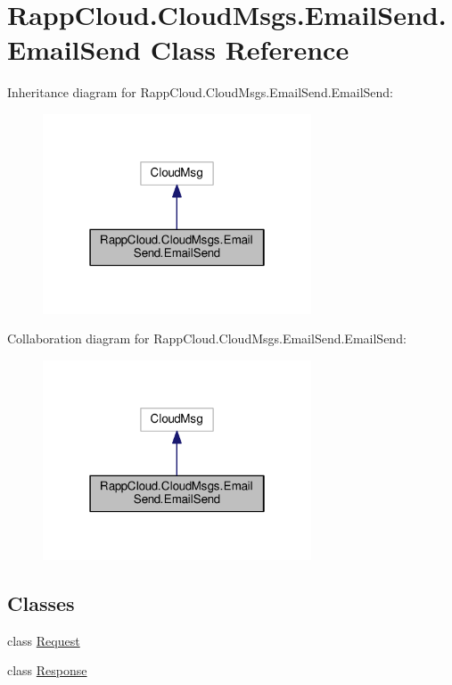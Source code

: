 \hypertarget{classRappCloud_1_1CloudMsgs_1_1EmailSend_1_1EmailSend}{\section{Rapp\-Cloud.\-Cloud\-Msgs.\-Email\-Send.\-Email\-Send Class Reference}
\label{classRappCloud_1_1CloudMsgs_1_1EmailSend_1_1EmailSend}
}


Inheritance diagram for Rapp\-Cloud.\-Cloud\-Msgs.\-Email\-Send.\-Email\-Send\-:
\nopagebreak
\begin{figure}[H]
\begin{center}
\leavevmode
\includegraphics[width=226pt]{classRappCloud_1_1CloudMsgs_1_1EmailSend_1_1EmailSend__inherit__graph}
\end{center}
\end{figure}


Collaboration diagram for Rapp\-Cloud.\-Cloud\-Msgs.\-Email\-Send.\-Email\-Send\-:
\nopagebreak
\begin{figure}[H]
\begin{center}
\leavevmode
\includegraphics[width=226pt]{classRappCloud_1_1CloudMsgs_1_1EmailSend_1_1EmailSend__coll__graph}
\end{center}
\end{figure}
\subsection*{Classes}
\begin{DoxyCompactItemize}
\item 
class \hyperlink{classRappCloud_1_1CloudMsgs_1_1EmailSend_1_1EmailSend_1_1Request}{Request}
\item 
class \hyperlink{classRappCloud_1_1CloudMsgs_1_1EmailSend_1_1EmailSend_1_1Response}{Response}
\end{DoxyCompactItemize}
